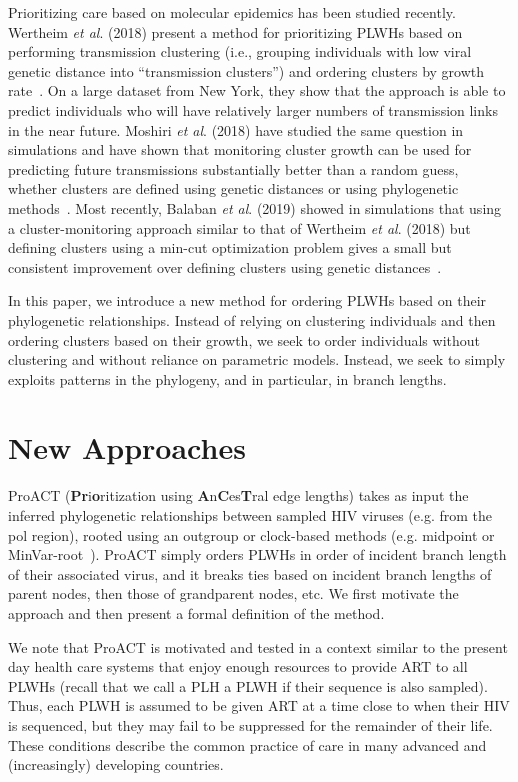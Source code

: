 Prioritizing care based on molecular epidemics has been studied recently. Wertheim \textit{et al}. (2018) present a method for prioritizing \glspl{PLWH} based on performing transmission clustering (i.e., grouping individuals with low viral genetic distance into ``transmission clusters'') and ordering clusters  by growth rate~\cite{Wertheim2018}. On a large dataset from New York, they show that the approach is able to predict individuals who will have relatively larger numbers of transmission links in the near future. Moshiri \textit{et al}. (2018) have studied the same question in simulations and have shown that monitoring cluster growth can be used for predicting future transmissions substantially better than a random guess, whether clusters are defined using genetic distances or using phylogenetic methods~\cite{Moshiri2018}. Most recently, Balaban \textit{et al}. (2019) showed in simulations that using a cluster-monitoring approach similar to that of Wertheim \textit{et al}. (2018) but defining clusters  using a min-cut optimization problem gives a small but consistent improvement over defining clusters using genetic distances~\cite{Balaban2019}.

In this paper, we introduce a new method for ordering \glspl{PLWH} based  on their phylogenetic relationships. Instead of relying on clustering individuals and then ordering clusters based on their growth, we seek to order individuals without clustering and without reliance on parametric models. Instead, we seek to simply exploits patterns in the phylogeny, and in particular, in branch lengths.

\section{New Approaches}
ProACT (\textbf{Pr}i\textbf{o}ritization using \textbf{A}n\textbf{C}es\textbf{T}ral edge lengths) takes as input the inferred phylogenetic relationships between sampled \gls{HIV} viruses (e.g. from the \gls{pol} region), rooted using an outgroup or clock-based methods (e.g. midpoint or MinVar-root~\cite{Mai2017}). ProACT simply orders \glspl{PLWH} in order of incident branch length of their associated virus, and it breaks ties based on incident branch lengths of parent nodes, then those of grandparent nodes, etc. We first motivate the approach and then present a formal definition of the method.

We note that ProACT is motivated and tested in a context similar to the present day health care systems that enjoy enough resources to provide \gls{ART} to all \glspl{PLWH} (recall that we call a \gls{PLH} a \gls{PLWH} if their sequence is also sampled). Thus, each \gls{PLWH} is assumed to be given \gls{ART} at a time close to when their \gls{HIV} is sequenced, but they may fail to be suppressed for the remainder of their life. These conditions describe the common practice of care in many advanced and (increasingly) developing countries.

